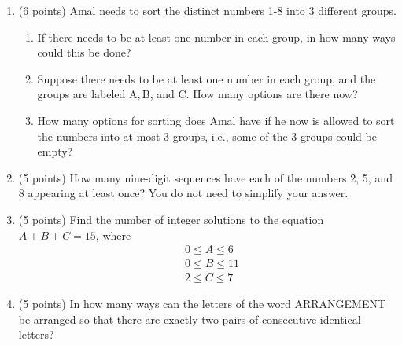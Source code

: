 \documentclass{article}
\begin{document}
\begin{enumerate}
  \newpage

  \item (6 points) Amal needs to sort the distinct numbers 1-8 into 3 different groups.
  \begin{enumerate}
    \item If there needs to be at least one number in each group, in how many ways could this be done?
    \begin{answer}
    \end{answer}
    \item Suppose there needs to be at least one number in each group, and the groups are labeled $\mathrm{A}, \mathrm{B}$, and C. How many options are there now?
    \begin{answer}
    \end{answer}
    \item How many options for sorting does Amal have if he now is allowed to sort the numbers into at most 3 groups, i.e., some of the 3 groups could be empty?
    \begin{answer}
    \end{answer}
  \end{enumerate}


  \newpage

  \item (5 points) How many nine-digit sequences have each of the numbers 2, 5, and 8 appearing at least once? You do not need to simplify your answer.
  \begin{answer}
  \end{answer}

  \item (5 points) Find the number of integer solutions to the equation $A+B+C=15$, where
  $$
  \begin{aligned}
  & 0 \leq A \leq 6 \\
  & 0 \leq B \leq 11 \\
  & 2 \leq C \leq 7
  \end{aligned}
  $$
  \begin{answer}
  \end{answer}

  \item (5 points) In how many ways can the letters of the word ARRANGEMENT be arranged so that there are exactly two pairs of consecutive identical letters?
  \begin{answer}
  \end{answer}
\end{enumerate}
\end{document}
